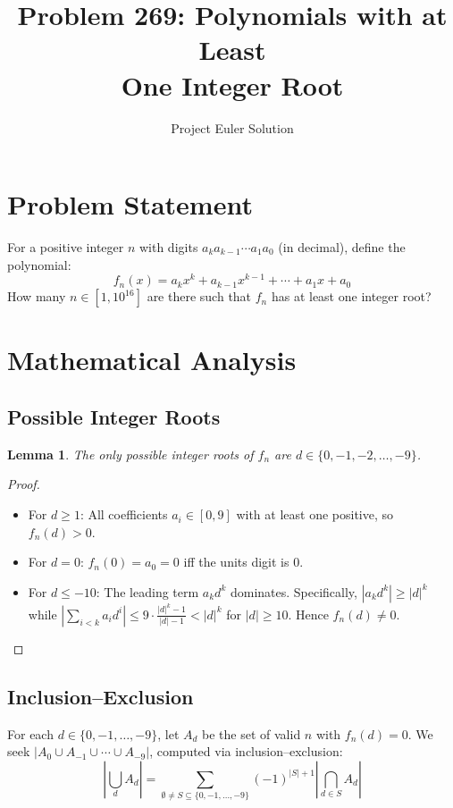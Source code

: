\documentclass[12pt]{article}
\title{Problem 269: Polynomials with at Least\\One Integer Root}
\author{Project Euler Solution}
\date{}
\newtheorem{lemma}[theorem]{Lemma}
\theoremstyle{definition}
\begin{document}
\maketitle

\section{Problem Statement}
For a positive integer $n$ with digits $a_k a_{k-1} \cdots a_1 a_0$ (in decimal), define the polynomial:
\[ f_n(x) = a_k x^k + a_{k-1} x^{k-1} + \cdots + a_1 x + a_0 \]
How many $n \in [1, 10^{16}]$ are there such that $f_n$ has at least one integer root?

\section{Mathematical Analysis}

\subsection{Possible Integer Roots}
\begin{lemma}
The only possible integer roots of $f_n$ are $d \in \{0, -1, -2, \ldots, -9\}$.
\end{lemma}

\begin{proof}
\begin{itemize}
    \item For $d \geq 1$: All coefficients $a_i \in [0,9]$ with at least one positive, so $f_n(d) > 0$.
    \item For $d = 0$: $f_n(0) = a_0 = 0$ iff the units digit is 0.
    \item For $d \leq -10$: The leading term $a_k d^k$ dominates. Specifically, $|a_k d^k| \geq |d|^k$ while $|\sum_{i<k} a_i d^i| \leq 9 \cdot \frac{|d|^k - 1}{|d|-1} < |d|^k$ for $|d| \geq 10$. Hence $f_n(d) \neq 0$.
\end{itemize}
\end{proof}

\subsection{Inclusion--Exclusion}
For each $d \in \{0, -1, \ldots, -9\}$, let $A_d$ be the set of valid $n$ with $f_n(d) = 0$. We seek $|A_0 \cup A_{-1} \cup \cdots \cup A_{-9}|$, computed via inclusion--exclusion:
\[ \left|\bigcup_{d} A_d\right| = \sum_{\emptyset \neq S \subseteq \{0,-1,\ldots,-9\}} (-1)^{|S|+1} \left|\bigcap_{d \in S} A_d\right| \]
\end{document}
